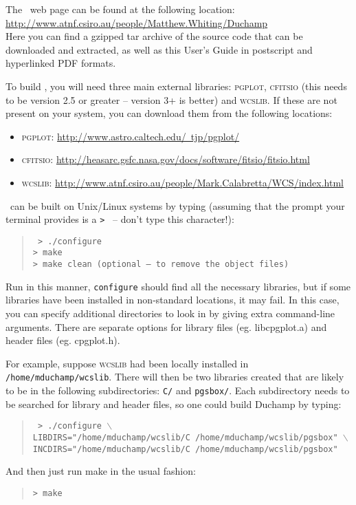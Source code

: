 \label{app-install}

The \duchamp\ web page can be found at the following location:\\
\href{http://www.atnf.csiro.au/people/Matthew.Whiting/Duchamp}%
{http://www.atnf.csiro.au/people/Matthew.Whiting/Duchamp}\\
Here you can find a gzipped tar archive of the source code that can be
downloaded and extracted, as well as this User's Guide in postscript
and hyperlinked PDF formats.

To build \duchamp, you will need three main external libraries:
\textsc{pgplot}, \textsc{cfitsio} (this needs to be version 2.5 or
greater -- version 3+ is better) and \textsc{wcslib}. If these are not
present on your system, you can download them from the following
locations:
\begin{itemize}
\item \textsc{pgplot}:
\href{http://www.astro.caltech.edu/~tjp/pgplot/}%
{http://www.astro.caltech.edu/~tjp/pgplot/}
\item \textsc{cfitsio}:
\href{http://heasarc.gsfc.nasa.gov/docs/software/fitsio/fitsio.html}%
{http://heasarc.gsfc.nasa.gov/docs/software/fitsio/fitsio.html}
\item \textsc{wcslib}:
\href{http://www.atnf.csiro.au/people/Mark.Calabretta/WCS/index.html}%
{http://www.atnf.csiro.au/people/Mark.Calabretta/WCS/index.html}
\end{itemize}

\duchamp\ can be built on Unix/Linux systems by typing (assuming that
the prompt your terminal provides is a \texttt{> } -- don't type this
character!):
\begin{quote}
\texttt{%
> ./configure\\
> make\\
> make clean (optional -- to remove the object files)}
\end{quote}

Run in this manner, \texttt{configure} should find all the necessary
libraries, but if some libraries have been installed in non-standard
locations, it may fail. In this case, you can specify additional
directories to look in by giving extra command-line arguments. There
are separate options for library files (eg. libcpgplot.a) and header
files (eg. cpgplot.h).

For example, suppose \textsc{wcslib} had been locally installed in
\texttt{/home/mduchamp/wcslib}. There will then be two libraries
created that are likely to be in the following subdirectories:
\texttt{C/} and \texttt{pgsbox/}. Each subdirectory needs to be
searched for library and header files, so one could build Duchamp by
typing:
\begin{quote}
\texttt{%
>  ./configure $\backslash$ \\ 
LIBDIRS="/home/mduchamp/wcslib/C /home/mduchamp/wcslib/pgsbox" 
$\backslash$\\
INCDIRS="/home/mduchamp/wcslib/C /home/mduchamp/wcslib/pgsbox"}
\end{quote}
And then just run make in the usual fashion:
\begin{quote}
\texttt{> make}
\end{quote}

